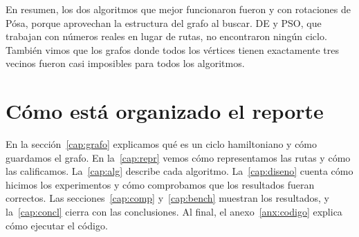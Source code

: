 En resumen, los dos algoritmos que mejor funcionaron fueron  y  con rotaciones
de Pósa, porque aprovechan la estructura del grafo al buscar. DE y PSO, que trabajan con números
reales en lugar de rutas, no encontraron ningún ciclo. También vimos que los grafos donde todos
los vértices tienen exactamente tres vecinos fueron casi imposibles para todos los algoritmos.

\section*{Cómo está organizado el reporte}
En la sección~\ref{cap:grafo} explicamos qué es un ciclo hamiltoniano y cómo guardamos el grafo.
En la~\ref{cap:repr} vemos cómo representamos las rutas y cómo las calificamos. La~\ref{cap:alg}
describe cada algoritmo. La~\ref{cap:diseno} cuenta cómo hicimos los experimentos y cómo
comprobamos que los resultados fueran correctos. Las secciones~\ref{cap:comp}
y~\ref{cap:bench} muestran los resultados, y la~\ref{cap:concl} cierra con las conclusiones. Al
final, el anexo~\ref{anx:codigo} explica cómo ejecutar el código.
